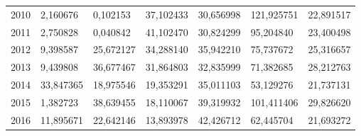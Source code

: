\begin{table}
\begin{tabular}{p{1cm}p{2cm}p{2cm}p{2cm}p{2cm}p{2cm}p{2cm}}
 2010 &                         2,160676 &     0,102153 &              37,102433 &                  30,656998 &                  121,925751 &                      22,891517 \\
 2011 &                         2,750828 &     0,040842 &              41,102470 &                  30,824299 &                   95,204840 &                      23,400498 \\
 2012 &                         9,398587 &    25,672127 &              34,288140 &                  35,942210 &                   75,737672 &                      25,316657 \\
 2013 &                         9,439808 &    36,677467 &              31,864803 &                  32,835999 &                   71,382685 &                      28,212763 \\
 2014 &                        33,847365 &    18,975546 &              19,353291 &                  35,011103 &                   53,129276 &                      21,737131 \\
 2015 &                         1,382723 &    38,639455 &              18,110067 &                  39,319932 &                  101,411406 &                      29,826620 \\
 2016 &                        11,895671 &    22,642146 &              13,893978 &                  42,426712 &                   62,445704 &                      21,693272 \\
\bottomrule
\end{tabular}
\end{table}
